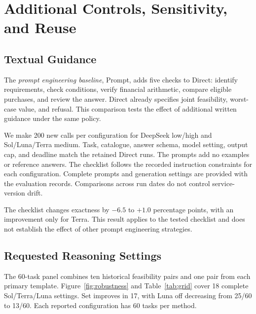 \section{Additional Controls, Sensitivity, and Reuse}
\label{app:execution}
\subsection{Textual Guidance}
\label{app:prompt-controls}
The \emph{prompt engineering baseline}, Prompt, adds five checks to Direct: identify requirements, check conditions, verify financial arithmetic, compare eligible purchases, and review the answer. Direct already specifies joint feasibility, worst-case value, and refusal. This comparison tests the effect of additional written guidance under the same policy.

We make 200 new calls per configuration for DeepSeek low/high and Sol/Luna/Terra medium. Task, catalogue, answer schema, model setting, output cap, and deadline match the retained Direct runs. The prompts add no examples or reference answers. The checklist follows the recorded instruction constraints for each configuration. Complete prompts and generation settings are provided with the evaluation records. Comparisons across run dates do not control service-version drift.

\begin{table}[!tbp]
\centering\small\setlength{\tabcolsep}{6pt}

\caption{\textbf{Textual guidance and fixed decision processing.} Direct, Prompt, and Set are exact-decision percentages on the same 200 tasks per configuration. Set uses the primary results in Table~\ref{tab:main}. Prompt U/R/O gives unsafe acceptance, false refusal, and other errors; $\Delta$ is Prompt minus Direct in percentage points (pp). All outcomes remain in their denominators.}
\label{tab:prompt-control}
\end{table}

The checklist changes exactness by $-6.5$ to $+1.0$ percentage points, with an improvement only for Terra. This result applies to the tested checklist and does not establish the effect of other prompt engineering strategies.

\subsection{Requested Reasoning Settings}
\label{app:grid}
The 60-task panel combines ten historical feasibility pairs and one pair from each primary template. Figure~\ref{fig:robustness} and Table~\ref{tab:grid} cover 18 complete Sol/Terra/Luna settings. Set improves in 17, with Luna off decreasing from 25/60 to 13/60. Each reported configuration has 60 tasks per method.

